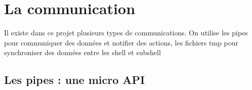 \documentclass{article}
\begin{document}
\newpage


\section{La communication}

Il existe dans ce projet plusieurs types de communications. On utilise les pipes pour communiquer des données et notifier des actions, les fichiers tmp pour synchroniser des données entre les shell et subshell  

\subsection{Les pipes : une micro API}
\end{document}
